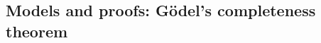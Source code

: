 

\setcounter{section}{3}
\setcounter{subsection}{2}
\setcounter{dfn}{13}

\subsection{Models and proofs: G\"odel's completeness theorem}


